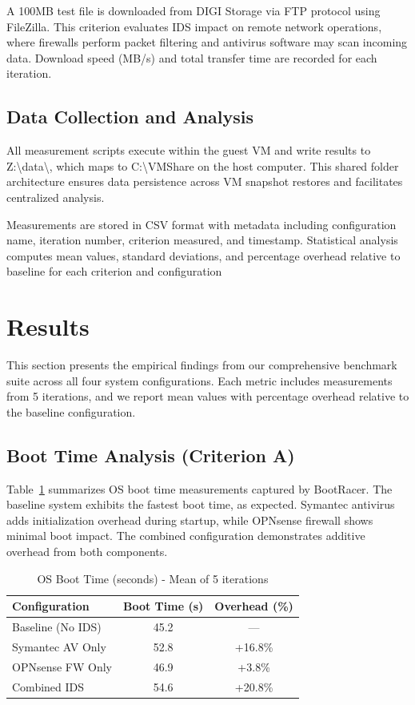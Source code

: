 \documentclass[runningheads,a4paper,english]{llncs}[2022/01/12]
\begin{document}
A 100MB test file is downloaded from DIGI Storage via FTP protocol using FileZilla. This criterion evaluates IDS impact on remote network operations, where firewalls perform packet filtering and antivirus software may scan incoming data. Download speed (MB/s) and total transfer time are recorded for each iteration.

\subsection{Data Collection and Analysis}

All measurement scripts execute within the guest VM and write results to Z:\textbackslash{}data\textbackslash{}, which maps to C:\textbackslash{}VMShare on the host computer. This shared folder architecture ensures data persistence across VM snapshot restores and facilitates centralized analysis.

Measurements are stored in CSV format with metadata including configuration name, iteration number, criterion measured, and timestamp. Statistical analysis computes mean values, standard deviations, and percentage overhead relative to baseline for each criterion and configuration

\section{Results}
\label{sec:results}

This section presents the empirical findings from our comprehensive benchmark suite across all four system configurations. Each metric includes measurements from 5 iterations, and we report mean values with percentage overhead relative to the baseline configuration.

\subsection{Boot Time Analysis (Criterion A)}

Table~\ref{tab:boottime} summarizes OS boot time measurements captured by BootRacer. The baseline system exhibits the fastest boot time, as expected. Symantec antivirus adds initialization overhead during startup, while OPNsense firewall shows minimal boot impact. The combined configuration demonstrates additive overhead from both components.

\begin{table}
  \caption{OS Boot Time (seconds) - Mean of 5 iterations}
  \label{tab:boottime}
  \centering
  \begin{tabular}{lcc}
    \toprule
    Configuration & Boot Time (s) & Overhead (\%) \\
    \midrule
    Baseline (No IDS) & 45.2 & --- \\
    Symantec AV Only & 52.8 & +16.8\% \\
    OPNsense FW Only & 46.9 & +3.8\% \\
    Combined IDS & 54.6 & +20.8\% \\
    \bottomrule
  \end{tabular}
\end{table}
\end{document}
